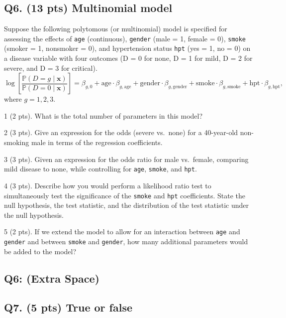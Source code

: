 \documentclass[
]{article}
\begin{document}
\subsection{Q6. (13 pts) Multinomial
model}\label{q6.-13-pts-multinomial-model}

Suppose the following polytomous (or multinomial) model is specified for
assessing the effects of \texttt{age} (continuous), \texttt{gender}
(male = 1, female = 0), \texttt{smoke} (smoker = 1, nonsmoker = 0), and
hypertension status \texttt{hpt} (yes = 1, no = 0) on a disease variable
with four outcomes (D = 0 for none, D = 1 for mild, D = 2 for severe,
and D = 3 for critical). \[
\log \left[ \frac{\mathbb{P}(D=g \mid \mathbf{x})}{\mathbb{P}(D=0 \mid \mathbf{x})} \right] = \beta_{g,0} + \text{age} \cdot \beta_{g,\text{age}} + \text{gender} \cdot \beta_{g,\text{gender}} + \text{smoke} \cdot \beta_{g,\text{smoke}} + \text{hpt} \cdot \beta_{g,\text{hpt}},
\] where \(g = 1, 2, 3\).

1 (2 pts). What is the total number of parameters in this model?

2 (3 pts). Give an expression for the odds (severe vs.~none) for a
40-year-old non-smoking male in terms of the regression coefficients.

3 (3 pts). Given an expression for the odds ratio for male vs.~female,
comparing mild disease to none, while controlling for \texttt{age},
\texttt{smoke}, and \texttt{hpt}.

4 (3 pts). Describe how you would perform a likelihood ratio test to
simultaneously test the significance of the \texttt{smoke} and
\texttt{hpt} coefficients. State the null hypothesis, the test
statistic, and the distribution of the test statistic under the null
hypothesis.

5 (2 pts). If we extend the model to allow for an interaction between
\texttt{age} and \texttt{gender} and between \texttt{smoke} and
\texttt{gender}, how many additional parameters would be added to the
model?

\newpage

\subsection{Q6: (Extra Space)}\label{q6-extra-space}

\newpage

\subsection{Q7. (5 pts) True or false}\label{q7.-5-pts-true-or-false}
\end{document}
